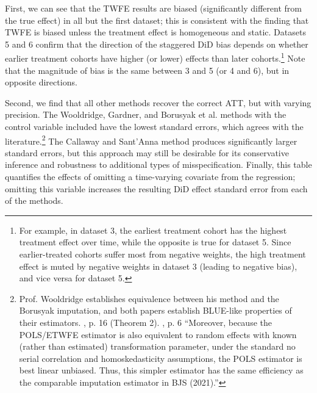 \documentclass[12pt]{article}
\begin{document}
First, we can see that the TWFE results are biased (significantly different from the true effect) in all but the first dataset; this is consistent with the finding that TWFE is biased unless the treatment effect is homogeneous and static. Datasets 5 and 6 confirm that the direction of the staggered DiD bias depends on whether earlier treatment cohorts have higher (or lower) effects than later cohorts.\footnote{For example, in dataset 3, the earliest treatment cohort has the highest treatment effect over time, while the opposite is true for dataset 5. Since earlier-treated cohorts suffer most from negative weights, the high treatment effect is muted by negative weights in dataset 3 (leading to negative bias), and vice versa for dataset 5.}  Note that the magnitude of bias is the same between 3 and 5 (or 4 and 6), but in opposite directions.

Second, we find that all other methods recover the correct ATT, but with varying precision. The Wooldridge, Gardner, and Borusyak et al. methods with the control variable included have the lowest standard errors, which agrees with the literature.\footnote{Prof. Wooldridge establishes equivalence between his method and the Borusyak imputation, and both papers establish BLUE-like properties of their estimators. \citet{borusyak2024revisiting}, p. 16 (Theorem 2). \citet{wooldridge2021two}, p. 6 “Moreover, because the POLS/ETWFE estimator is also equivalent to random effects with known (rather than estimated) transformation parameter, under the standard no serial correlation and homoskedasticity assumptions, the POLS estimator is best linear unbiased. Thus, this simpler estimator has the same efficiency as the comparable imputation estimator in BJS (2021).”}  The Callaway and Sant’Anna method produces significantly larger standard errors, but this approach may still be desirable for its conservative inference and robustness to additional types of misspecification. Finally, this table quantifies the effects of omitting a time-varying covariate from the regression; omitting this variable increases the resulting DiD effect standard error from each of the methods.
\end{document}
